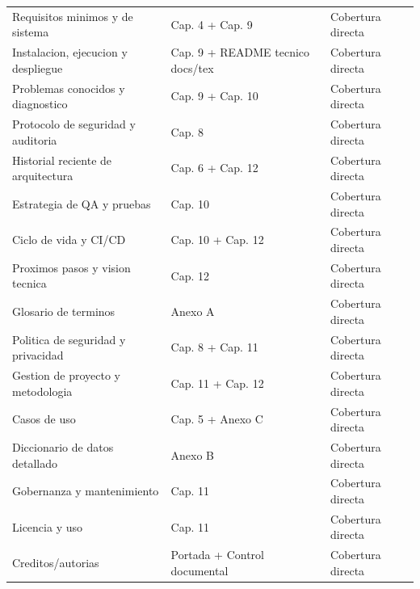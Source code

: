 \begin{longtable}{p{} p{} p{}}
Requisitos minimos y de sistema & Cap. 4 + Cap. 9 & Cobertura directa \\
Instalacion, ejecucion y despliegue & Cap. 9 + README tecnico docs/tex & Cobertura directa \\
Problemas conocidos y diagnostico & Cap. 9 + Cap. 10 & Cobertura directa \\
Protocolo de seguridad y auditoria & Cap. 8 & Cobertura directa \\
Historial reciente de arquitectura & Cap. 6 + Cap. 12 & Cobertura directa \\
Estrategia de QA y pruebas & Cap. 10 & Cobertura directa \\
Ciclo de vida y CI/CD & Cap. 10 + Cap. 12 & Cobertura directa \\
Proximos pasos y vision tecnica & Cap. 12 & Cobertura directa \\
Glosario de terminos & Anexo A & Cobertura directa \\
Politica de seguridad y privacidad & Cap. 8 + Cap. 11 & Cobertura directa \\
Gestion de proyecto y metodologia & Cap. 11 + Cap. 12 & Cobertura directa \\
Casos de uso & Cap. 5 + Anexo C & Cobertura directa \\
Diccionario de datos detallado & Anexo B & Cobertura directa \\
Gobernanza y mantenimiento & Cap. 11 & Cobertura directa \\
Licencia y uso & Cap. 11 & Cobertura directa \\
Creditos/autorias & Portada + Control documental & Cobertura directa \\
\bottomrule
\end{longtable}
